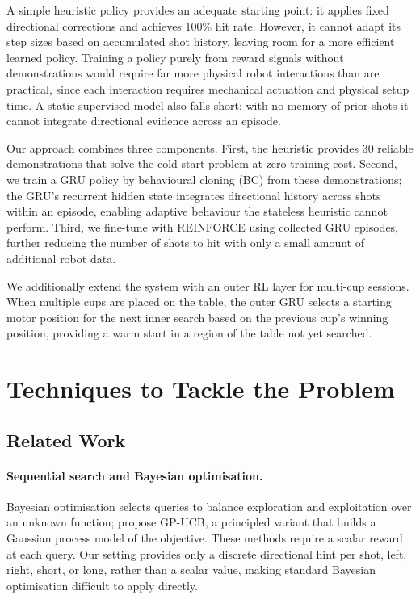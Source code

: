 \documentclass[twoside,11pt]{article}
\begin{document}
A simple heuristic policy provides an adequate starting point: it applies fixed
directional corrections and achieves 100\% hit rate. However, it cannot adapt
its step sizes based on accumulated shot history, leaving room for a more
efficient learned policy. Training a policy purely from reward signals without
demonstrations would require far more physical robot interactions than are
practical, since each interaction requires mechanical actuation and physical
setup time. A static supervised model also falls short: with no memory of prior
shots it cannot integrate directional evidence across an episode.

Our approach combines three components. First, the heuristic provides 30
reliable demonstrations that solve the cold-start problem at zero training
cost. Second, we train a GRU policy by behavioural cloning (BC) from these
demonstrations; the GRU's recurrent hidden state integrates directional history
across shots within an episode, enabling adaptive behaviour the stateless
heuristic cannot perform. Third, we fine-tune with REINFORCE using collected
GRU episodes, further reducing the number of shots to hit with only a small
amount of additional robot data.

We additionally extend the system with an outer RL layer for multi-cup
sessions. When multiple cups are placed on the table, the outer GRU selects a
starting motor position for the next inner search based on the previous cup's
winning position, providing a warm start in a region of the table not yet
searched.

\section{Techniques to Tackle the Problem}

\subsection{Related Work}

\paragraph{Sequential search and Bayesian optimisation.}
Bayesian optimisation selects queries to balance exploration and exploitation
over an unknown function; \citet{srinivas2010gaussian} propose GP-UCB, a
principled variant that builds a Gaussian process model of the objective. These
methods require a scalar reward at each query. Our setting provides only a
discrete directional hint per shot, left, right, short, or long, rather than
a scalar value, making standard Bayesian optimisation difficult to apply
directly.
\end{document}

